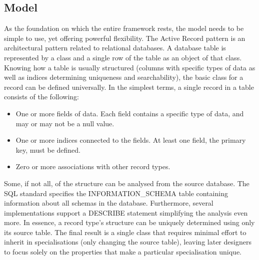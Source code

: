 \subsection{Model}
\label{design_tech_model}
As the foundation on which the entire framework rests, the model needs to be simple to use, yet offering powerful flexibility. The Active Record pattern is an architectural pattern related to relational databases. A database table is represented by a class and a single row of the table as an object of that class. Knowing how a table is usually structured (columns with specific types of data as well as indices determining uniqueness and searchability), the basic class for a record can be defined universally.
In the simplest terms, a single record in a table consists of the following:
\begin{itemize}
    \item One or more fields of data. Each field contains a specific type of data, and may or may not be a null value.
    \item One or more indices connected to the fields. At least one field, the primary key, must be defined.
    \item Zero or more associations with other record types.
\end{itemize}
Some, if not all, of the structure can be analysed from the source database. The SQL standard specifies the INFORMATION\_SCHEMA table containing information about all schemas in the database. Furthermore, several implementations support a DESCRIBE statement simplifying the analysis even more. In essence, a record type's structure can be uniquely determined using only its source table.
The final result is a single class that requires minimal effort to inherit in specialisations (only changing the source table), leaving later designers to focus solely on the properties that make a particular specialisation unique.

